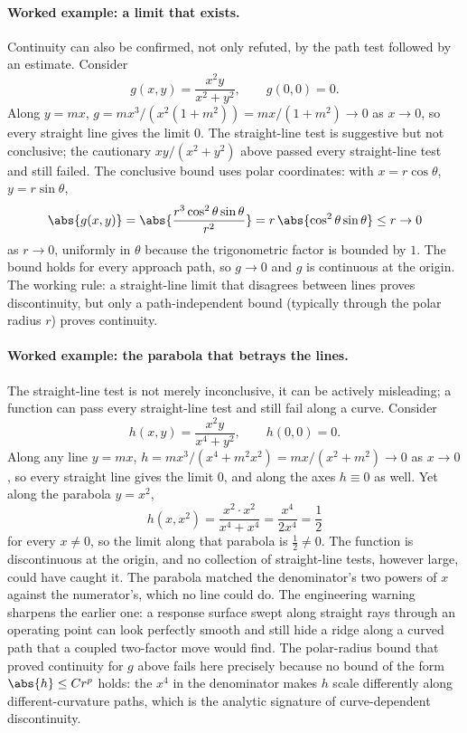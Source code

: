 \paragraph{Worked example: a limit that exists.} Continuity can also
be confirmed, not only refuted, by the path test followed by an
estimate. Consider
\[
g(x, y) = \frac{x^{2} y}{x^{2} + y^{2}}, \qquad g(0, 0) = 0.
\]
Along $y = mx$, $g = m x^{3} / (x^{2}(1 + m^{2})) = m x / (1 + m^{2})
\to 0$ as $x \to 0$, so every straight line gives the limit $0$. The
straight-line test is suggestive but not conclusive; the cautionary
$xy/(x^{2} + y^{2})$ above passed every straight-line test and still
failed. The conclusive bound uses polar coordinates: with $x =
r\cos\theta$, $y = r\sin\theta$,
\[
\abs{g(x, y)} = \abs{\frac{r^{3}\cos^{2}\theta\sin\theta}{r^{2}}}
= r\,\abs{\cos^{2}\theta\sin\theta} \leq r \to 0
\]
as $r \to 0$, uniformly in $\theta$ because the trigonometric factor
is bounded by $1$. The bound holds for every approach path, so
$g \to 0$ and $g$ is continuous at the origin. The working rule: a
straight-line limit that disagrees between lines proves
discontinuity, but only a path-independent bound (typically through
the polar radius $r$) proves continuity.

\paragraph{Worked example: the parabola that betrays the lines.} The
straight-line test is not merely inconclusive, it can be actively
misleading; a function can pass every straight-line test and still fail
along a curve. Consider
\[
h(x, y) = \frac{x^{2} y}{x^{4} + y^{2}}, \qquad h(0, 0) = 0.
\]
Along any line $y = mx$, $h = m x^{3}/(x^{4} + m^{2} x^{2}) =
m x/(x^{2} + m^{2}) \to 0$ as $x \to 0$, so every straight line gives
the limit $0$, and along the axes $h \equiv 0$ as well. Yet along the
parabola $y = x^{2}$,
\[
h(x, x^{2}) = \frac{x^{2}\cdot x^{2}}{x^{4} + x^{4}}
= \frac{x^{4}}{2 x^{4}} = \frac{1}{2}
\]
for every $x \neq 0$, so the limit along that parabola is $\tfrac{1}{2}
\neq 0$. The function is discontinuous at the origin, and no collection
of straight-line tests, however large, could have caught it. The
parabola matched the denominator's two powers of $x$ against the
numerator's, which no line could do. The engineering warning sharpens the
earlier one: a response surface swept along straight rays through an
operating point can look perfectly smooth and still hide a ridge along a
curved path that a coupled two-factor move would find. The polar-radius
bound that proved continuity for $g$ above fails here precisely because
no bound of the form $\abs{h} \leq C r^{p}$ holds: the $x^{4}$ in the
denominator makes $h$ scale differently along different-curvature paths,
which is the analytic signature of curve-dependent discontinuity.

